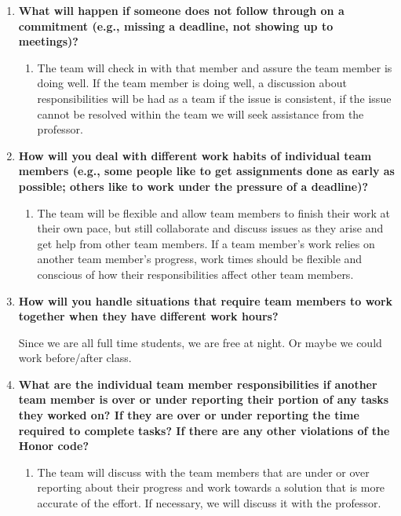 \documentclass[12pt]{article}
\begin{document}
\begin{enumerate}
    \item \textbf{What will happen if someone does not follow through on a commitment (e.g., missing a deadline, not showing up to meetings)?}
    \begin{enumerate}
        \item The team will check in with that member and assure the team member is doing well. If the team member is doing well, a discussion about responsibilities will be had as a team if the issue is consistent, if the issue cannot be resolved within the team we will seek assistance from the professor.
    \end{enumerate}

    \item \textbf{How will you deal with different work habits of individual team members (e.g., some people like to get assignments done as early as possible; others like to work under the pressure of a deadline)?}
    \begin{enumerate}
        \item The team will be flexible and allow team members to finish their work at their own pace, but still collaborate and discuss issues as they arise and get help from other team members. If a team member's work relies on another team member's progress, work times should be flexible and conscious of how their responsibilities affect other team members.
    \end{enumerate}

    \item \textbf{How will you handle situations that require team members to work together when they have different work hours?}

    Since we are all full time students, we are free at night. Or maybe we could work before/after class.

    \item \textbf{What are the individual team member responsibilities if another team member is over or under reporting their portion of any tasks they worked on? If they are over or under reporting the time required to complete tasks? If there are any other violations of the Honor code?}
    \begin{enumerate}
        \item The team will discuss with the team members that are under or over reporting about their progress and work towards a solution that is more accurate of the effort. If necessary, we will discuss it with the professor.
    \end{enumerate}
\end{enumerate}
\end{document}
